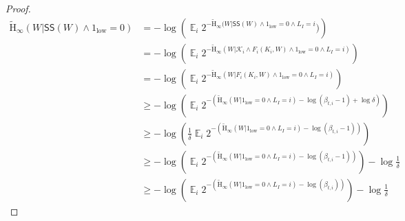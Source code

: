 \documentclass[11pt]{article}
\DeclareMathOperator*{\expe}{\mathbb{E}}
\newcommand{\class}[1]{{\ensuremath{\mathsf{#1}}}}
\newcommand{\sketch}{\ensuremath{\class{SS}}\xspace}
\newcommand{\Hav}{\tilde{\mathrm{H}}_\infty}
\begin{document}
\begin{proof}
\begin{align}
\Hav(W | \sketch(W) \wedge 1_{\text{low}} =0) &=-\log \left( \expe_{i} 2^{-\Hav(W | \sketch(W) \wedge 1_{\text{low}}=0 \wedge L_I =i }) \right)\nonumber\\
&=-\log \left( \expe_{i} 2^{-\Hav(W | \mathcal{K}_i \wedge F_i(K_i, W) \wedge 1_{\text{low}}=0 \wedge L_I=i)}\right)\nonumber\\
&=-\log \left( \expe_{i} 2^{-\Hav(W |  F_i(K_i, W) \wedge 1_{\text{low}}=0 \wedge L_I=i)}\right)\nonumber\\
&\ge-\log \left( \expe_{i} 2^{-(\Hav(W |  1_{\text{low}}=0 \wedge L_I=i)-\log (\beta_{t, i}-1) +\log \delta)}\right)\nonumber\\
&\ge-\log \left(\frac{1}{\delta} \expe_{i} 2^{-(\Hav(W |  1_{\text{low}}=0 \wedge L_I=i)-\log (\beta_{t, i}-1))}\right)\nonumber\\
&\ge-\log \left(\expe_{i} 2^{-(\Hav(W |  1_{\text{low}}=0 \wedge L_I=i)-\log (\beta_{t, i}-1))}\right) - \log \frac{1}{\delta}\nonumber\\
&\ge-\log \left(\expe_{i} 2^{-(\Hav(W |  1_{\text{low}}=0 \wedge L_I=i)-\log (\beta_{t, i}))}\right) - \log \frac{1}{\delta}\label{eq:fuzzy ball size}
\end{align}


\end{proof}
\end{document}
